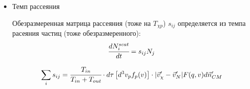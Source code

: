 \documentclass[a4paper, 14pt]{article}
\begin{document}
\begin{itemize}
		Под $\sigma_{\xi p}$ подразумевается величина
		\begin{equation*}
			\sigma_{\xi p} = \int{\cfrac{ |\mathcal{M}_0|^2  }{64\pi^2 (E_p+E_{\chi})^2} d\Omega}
		\end{equation*}
		
		Тогда, используя безразмерные параметры, получаем:
		\begin{equation*}
			c_i = \int{ dr^3 \int{d^3\vec{v}_{\chi}\int{ \widetilde{f}(\vec{v}_{\chi}) 
				\widetilde{n}_N(r)  \cdot |\vec{v}_{\chi}'-\vec{v}_{N}'| F(q,v) d\vec{n}'_{CM} }}} 
		\end{equation*}
		
		где функция распределения ТМ равна $n_{\chi,\infty} \widetilde{f}(\vec{v}_{\chi})$, $d\vec{n}'_{CM}$ --- элемент выходного фазового объема (направление выходной скорости в системе Ц.М.), полный интеграл которого равен 1 ($\int {d\vec{n}'_{CM} } = 1$)
		\begin{equation*}
			d\vec{n}'_{CM} = \cfrac{d\cos{\theta'} d \varphi' }{4\pi}
		\end{equation*}
		
		Начальная скорость: 
		\begin{equation*}
			d^3\vec{v}_{\chi} \widetilde{f}(\vec{v}_{\chi}) = 2\pi v dv^2 f_e(v^2) = 2\pi v du^2 f_e(u^2)  
		\end{equation*}
		где $v^2 = v^2_{esc}(r) + u^2$, $v_{esc}(r)$ --- скорость вылета в точке $r$, $u$ --- скорость на бесконечности $f_e(u^2)$ --- эффективная плотность на бесконечности с учётом скорости движения небесного тела относительно гало $u_0$ ($\vec{u} = \vec{u}_0 + \vec{w}$) где $\vec{w}$ --- скорость в гало. 
		\begin{equation*}
			f_e(u^2) = \int_{-1}^1 {f(u^2+u^2_0 + 2 u u_0 x) \cfrac{dx}{2}}
		\end{equation*}
		
		\item Темп рассеяния
		
		Обезразмеренная матрица рассеяния (тоже на $T_{\chi p}$) $s_{ij}$ определяется из 
		темпа расеяния частиц (тоже обезразмеренного):
		\begin{equation*}
		\cfrac{d N_{i}^{scat}}{dt} = s_{ij} N_j
		\end{equation*}
		
		\begin{equation*}
			\sum_i{s_{ij}} = 
			\cfrac{T_{in}}{T_{in}+T_{out}} \cdot d\tau \left[ d^3v_p f_p(v) \right] \cdot |\vec{v}_{\chi}'-\vec{v}_{N}'| F(q,v) d\vec{n}'_{CM}
		\end{equation*}
		

\end{itemize}
\end{document}
